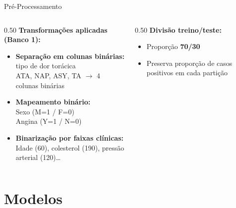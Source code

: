 \documentclass[aspectratio=169,11pt,brazil]{beamer}
\begin{document}
\begin{frame}{Pré-Processamento}
  \begin{columns}[T]
    \begin{column}{0.50\textwidth}
      \textbf{Transformações aplicadas (Banco 1):}
      \begin{itemize}
        \item \textbf{Separação em colunas binárias:} tipo de dor torácica\\
              ATA, NAP, ASY, TA $\to$ 4 colunas binárias
        \item \textbf{Mapeamento binário:}\\
              Sexo (M=1 / F=0)\\
              Angina (Y=1 / N=0)
        \item \textbf{Binarização por faixas clínicas:}\\
              Idade (60), colesterol (190), pressão arterial (120)\ldots
      \end{itemize}
    \end{column}
    \begin{column}{0.50\textwidth}
      \textbf{Divisão treino/teste:}
      \begin{itemize}
        \item Proporção \textbf{70/30}
        \item Preserva proporção de casos positivos em cada partição
      \end{itemize}
    \end{column}
  \end{columns}
\end{frame}

\section{Modelos}
\end{document}
